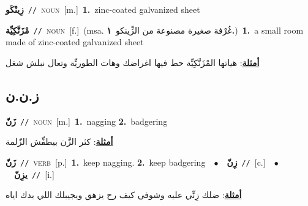 \documentclass[10pt,a4paper,twoside]{article} %
\begin{document}
\begin{multicols}{2}
{\setlength\topsep{0pt}\textbf{\foreignlanguage{arabic}{زِينْكَو}}\ {\color{gray}\texttt{//}\color{black}}\ \textsc{noun}\ [m.]\ \textbf{1.}~zinc-coated galvanized sheet\ } \vspace{2mm}

{\setlength\topsep{0pt}\textbf{\foreignlanguage{arabic}{مْزَنَّكِيِّة}}\ {\color{gray}\texttt{//}\color{black}}\ \textsc{noun}\ [f.]\ \color{gray}(msa. \foreignlanguage{arabic}{غُرْفة صغيرة مصنوعة من الزِّينكو}~\foreignlanguage{arabic}{\textbf{١.}})\color{black}\ \textbf{1.}~a small room made of zinc-coated galvanized sheet\  \begin{flushright}\color{gray}\foreignlanguage{arabic}{\textbf{\underline{\foreignlanguage{arabic}{أمثلة}}}: هياتها المْزَنَّكِيِّة حط فيها اغراضك وهات الطوريِّة وتعال نبلش شغل}\end{flushright}\color{black}} \vspace{2mm}

\vspace{-3mm}
\subsection*{\color{blue}\foreignlanguage{arabic}{ز.ن.ن}\color{blue}{}} 

{\setlength\topsep{0pt}\textbf{\foreignlanguage{arabic}{زَنّ}}\ {\color{gray}\texttt{//}\color{black}}\ \textsc{noun}\ [m.]\ \textbf{1.}~nagging  \textbf{2.}~badgering\  \begin{flushright}\color{gray}\foreignlanguage{arabic}{\textbf{\underline{\foreignlanguage{arabic}{أمثلة}}}: كثر الزَّن بيطفِّش الزّلمة}\end{flushright}\color{black}} \vspace{2mm}

{\setlength\topsep{0pt}\textbf{\foreignlanguage{arabic}{زَنّ}}\ {\color{gray}\texttt{//}\color{black}}\ \textsc{verb}\ [p.]\ \textbf{1.}~keep nagging.  \textbf{2.}~keep badgering\ \ $\bullet$\ \ \setlength\topsep{0pt}\textbf{\foreignlanguage{arabic}{زِنّ}}\ {\color{gray}\texttt{//}\color{black}}\ [c.]\ \ $\bullet$\ \ \setlength\topsep{0pt}\textbf{\foreignlanguage{arabic}{يزِنّ}}\ {\color{gray}\texttt{//}\color{black}}\ [i.]\  \begin{flushright}\color{gray}\foreignlanguage{arabic}{\textbf{\underline{\foreignlanguage{arabic}{أمثلة}}}: ضلك زِنِّي عليه وشوفي كيف رح يزهق ويجيبلك اللي بدك اياه}\end{flushright}\color{black}} \vspace{2mm}


\end{multicols}
\end{document}
